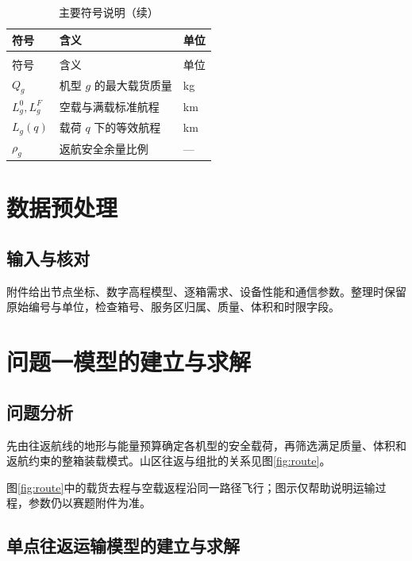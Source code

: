 \documentclass[withoutpreface]{gmcmthesis}
\begin{document}
\Needspace{130pt}
\begingroup
\papertablestyle
\setlength{\LTpre}{6pt}
\setlength{\LTpost}{6pt}
\begin{longtable}{@{}Y{36mm}Y{100mm}Y{15mm}@{}}
\caption{主要符号说明}\label{tab:symbols}\\
\toprule
符号 & 含义 & 单位 \\
\midrule
\endfirsthead
\caption[]{主要符号说明（续）}\\
\toprule
符号 & 含义 & 单位 \\
\midrule
\endhead
\bottomrule
\endfoot
$Q_g$ & 机型 $g$ 的最大载货质量 & kg \\
\addlinespace[5pt]
$L_g^0,L_g^F$ & 空载与满载标准航程 & km \\
\addlinespace[5pt]
$L_g(q)$ & 载荷 $q$ 下的等效航程 & km \\
\addlinespace[5pt]
$\rho_g$ & 返航安全余量比例 & — \\
\end{longtable}
\endgroup

\Needspace{94pt}
\section{数据预处理}
\subsection{输入与核对}
附件给出节点坐标、数字高程模型、逐箱需求、设备性能和通信参数。整理时保留原始编号与单位，检查箱号、服务区归属、质量、体积和时限字段。

\Needspace{94pt}
\section{问题一模型的建立与求解}
\subsection{问题分析}
先由往返航线的地形与能量预算确定各机型的安全载荷，再筛选满足质量、体积和返航约束的整箱装载模式。山区往返与组批的关系见图\ref{fig:route}。


图\ref{fig:route}中的载货去程与空载返程沿同一路径飞行；图示仅帮助说明运输过程，参数仍以赛题附件为准。

\subsection{单点往返运输模型的建立与求解}
\end{document}
